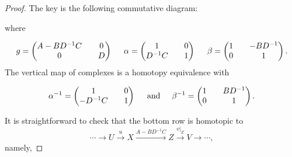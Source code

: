 \documentclass[psamsfonts,a4paper]{amsart}
\theoremstyle{plain}
\numberwithin{equation}{section}
\numberwithin{figure}{section}
\renewcommand{\a}{\alpha}
\renewcommand{\b}{\beta}
\newcommand{\ra}{\rightarrow}
\newcommand{\xra}{\xrightarrow}
\newcommand{\op}{\oplus}
\newcommand{\<}{\langle}
\renewcommand{\>}{\rangle}
\theoremstyle{named}
\theoremstyle{name}
\begin{document}
\color{blue}
\begin{proof}
The key is the following commutative diagram:

\begin{center}
\end{center}

where 

$$g = \begin{pmatrix}
A-BD^{-1}C && 0 \\
0  && D
\end{pmatrix}  \hspace{5mm}
\a = \begin{pmatrix}
1  &&  0 \\
D^{-1}C  && 1
\end{pmatrix}  \hspace{5mm}
\b = \begin{pmatrix}
1 && -BD^{-1}  \\
0 && 1 
\end{pmatrix}.$$
The vertical map of complexes is a homotopy equivalence with 

$$
\a^{-1} = \begin{pmatrix}
1  &&  0 \\
-D^{-1}C  && 1
\end{pmatrix}  \hspace{5mm} \text{and} \hspace{5mm} 
\b^{-1} = \begin{pmatrix}
1 && BD^{-1}  \\
0 && 1 
\end{pmatrix}.$$


 It is straightforward to check that the bottom row is homotopic to 
$$\cdots \ra U \xra{u} X  \xra{A-BD^{-1}C} Z \xra{v|_Z} V \ra \cdots ,$$
namely, 



\end{proof}
\end{document}
